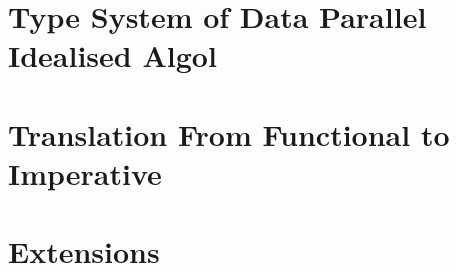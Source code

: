\documentclass[
  nonacm,
  format=acmsmall,
  screen=true,
  timestamp=true
]{acmart}
\begin{document}
\maketitle


\section{Type System of Data Parallel Idealised Algol}
\label{sec:typeSystem}


\clearpage

\section{Translation From Functional to Imperative}
\label{sec:translation}


\clearpage

\section{Extensions}



\end{document}

